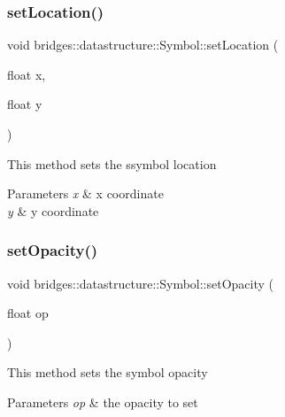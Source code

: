 \subsubsection{\texorpdfstring{setLocation()}{setLocation()}\hspace{0.1cm}{\footnotesize\ttfamily [2/2]}}
{\footnotesize\ttfamily void bridges\+::datastructure\+::\+Symbol\+::set\+Location (\begin{DoxyParamCaption}\item[{float}]{x,  }\item[{float}]{y }\end{DoxyParamCaption})\hspace{0.3cm}{\ttfamily [inline]}}

This method sets the ssymbol location


\begin{DoxyParams}{Parameters}
{\em x} & x coordinate \\
\hline
{\em y} & y coordinate \\
\hline
\end{DoxyParams}
\mbox{\label{classbridges_1_1datastructure_1_1_symbol_a889bace56d39df0ac09ba408ca868b7d}} 
\subsubsection{\texorpdfstring{setOpacity()}{setOpacity()}}
{\footnotesize\ttfamily void bridges\+::datastructure\+::\+Symbol\+::set\+Opacity (\begin{DoxyParamCaption}\item[{float}]{op }\end{DoxyParamCaption})\hspace{0.3cm}{\ttfamily [inline]}}

This method sets the symbol opacity


\begin{DoxyParams}{Parameters}
{\em op} & the opacity to set \\
\hline
\end{DoxyParams}
\mbox{\label{classbridges_1_1datastructure_1_1_symbol_add56ff3bb5b276c016cfe377ff0f3fe2}} 
